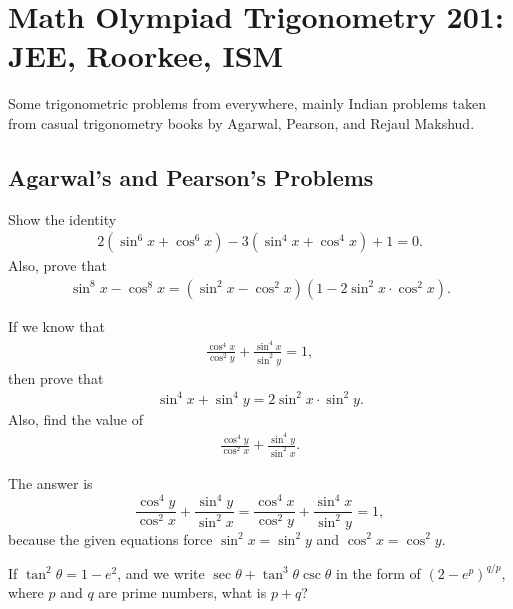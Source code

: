 \newpage
\section{Math Olympiad Trigonometry 201:\\ JEE, Roorkee, ISM}
Some trigonometric problems from everywhere, mainly Indian problems taken from casual trigonometry books by Agarwal, Pearson, and Rejaul Makshud.

\subsection{Agarwal's and Pearson's Problems}

\begin{question}
Show the identity
    \begin{align}
        2(\sin^6 x + \cos^6 x) - 3(\sin^4 x + \cos^4 x) + 1 =0. \label{id:sixfour}
    \end{align}
Also, prove that
    \begin{align}
        \sin^8 x - \cos^8 x = (\sin^2 x - \cos^2 x)(1-2\sin^2 x \cdot \cos^2 x).\label{id:eight}
    \end{align}
\end{question}




\begin{question}
If we know that
    \begin{align*}
        \frac{\cos^4 x}{\cos^2 y} + \frac{\sin^4 x}{\sin^2 y}=1,
    \end{align*}
then prove that
    \begin{align}
        \sin^4 x + \sin^4 y = 2\sin^2 x \cdot \sin^2 y. \label{id:fourfour}
    \end{align}
Also, find the value of
    \begin{align}
       \frac{\cos^4 y}{\cos^2 x} + \frac{\sin^4 y}{\sin^2 x}.\label{id:fourtwo-reciprocal}
    \end{align}
\end{question}

\begin{solution}
    The answer is $$ \frac{\cos^4 y}{\cos^2 x} + \frac{\sin^4 y}{\sin^2 x} = \frac{\cos^4 x}{\cos^2 y} + \frac{\sin^4 x}{\sin^2 y}=1,$$ 
    because the given equations force $\sin^2 x = \sin^2 y$ and $\cos^2 x = \cos^2 y$.
\end{solution}

\begin{question}
If $\tan^2 \theta = 1 -e^2$, and we write $\sec \theta + \tan^3 \theta \csc \theta$ in the form of $(2-e^p)^{q/p}$, where $p$ and $q$ are prime numbers, what is $p+q$?
\end{question}

